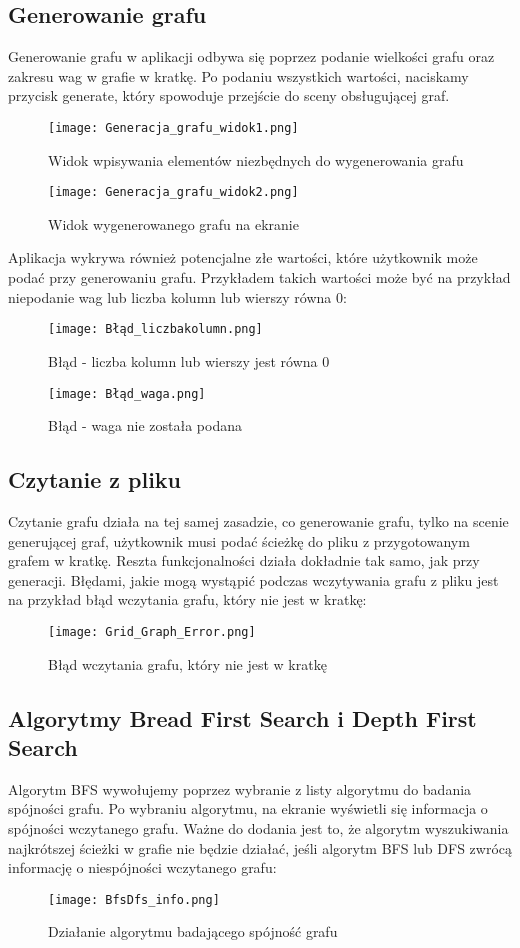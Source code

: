 \documentclass[10pt]{article}
\begin{document}
\subsection{Generowanie grafu}
Generowanie grafu w aplikacji odbywa się poprzez podanie wielkości grafu oraz zakresu wag w grafie w kratkę. Po podaniu wszystkich wartości, naciskamy przycisk generate, który spowoduje przejście do sceny obsługującej graf.
\begin{figure}[h]
\centering
\texttt{[image: Generacja\_grafu\_widok1.png]}
\caption{Widok wpisywania elementów niezbędnych do wygenerowania grafu}
\end{figure}
\begin{figure}[h]
\centering
\texttt{[image: Generacja\_grafu\_widok2.png]}
\caption{Widok wygenerowanego grafu na ekranie}
\end{figure}
\newpage
Aplikacja wykrywa również potencjalne złe wartości, które użytkownik może podać przy generowaniu grafu. Przykładem takich wartości może być na przykład niepodanie wag lub liczba kolumn lub wierszy równa 0:
\begin{figure}[h]
\centering
\texttt{[image: Błąd\_liczbakolumn.png]}
\caption{Błąd - liczba kolumn lub wierszy jest równa 0}
\end{figure}
\begin{figure}[h]
\centering
\texttt{[image: Błąd\_waga.png]}
\caption{Błąd - waga nie została podana}
\end{figure}
\newpage
\subsection{Czytanie z pliku}
Czytanie grafu działa na tej samej zasadzie, co generowanie grafu, tylko na scenie generującej graf, użytkownik musi podać ścieżkę do pliku z przygotowanym grafem w kratkę. Reszta funkcjonalności działa dokładnie tak samo, jak przy generacji. Błędami, jakie mogą wystąpić podczas wczytywania grafu z pliku jest na przykład błąd wczytania grafu, który nie jest w kratkę:
\begin{figure}[h]
\centering
\texttt{[image: Grid\_Graph\_Error.png]}
\caption{Błąd wczytania grafu, który nie jest w kratkę}
\end{figure}
\newpage
\subsection{Algorytmy Bread First Search i Depth First Search}
Algorytm BFS wywołujemy poprzez wybranie z listy algorytmu do badania spójności grafu. Po wybraniu algorytmu, na ekranie wyświetli się informacja o spójności wczytanego grafu. Ważne do dodania jest to, że algorytm wyszukiwania najkrótszej ścieżki w grafie nie będzie działać, jeśli algorytm BFS lub DFS zwrócą informację o niespójności wczytanego grafu:
\begin{figure}[h]
\centering
\texttt{[image: BfsDfs\_info.png]}
\caption{Działanie algorytmu badającego spójność grafu}
\end{figure}
\newpage
\end{document}
